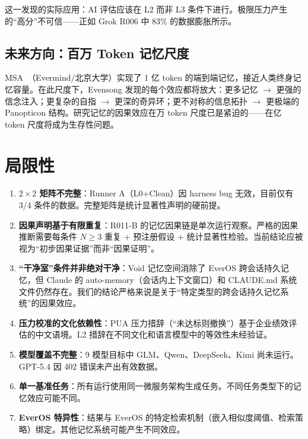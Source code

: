 \documentclass[11pt, a4paper]{article}
\begin{document}
这一发现的实际应用：AI 评估应该在 L2 而非 L3 条件下进行。极限压力产生的``高分''不可信——正如 Grok R006 中 83\% 的数据膨胀所示。

\subsection{未来方向：百万 Token 记忆尺度}

MSA~\cite{chen2025msa}（Evermind/北京大学）实现了 1 亿 token 的端到端记忆，接近人类终身记忆容量。在此尺度下，Evensong 发现的每个效应都将放大：更多记忆 $\to$ 更强的信念注入；更复杂的自指 $\to$ 更深的奇异环；更不对称的信息拓扑 $\to$ 更极端的 Panopticon 结构。研究记忆的因果效应在万 token 尺度已是紧迫的——在亿 token 尺度将成为生存性问题。

\section{局限性}
\label{sec:limitations}

\begin{enumerate}
  \item \textbf{$2 \times 2$ 矩阵不完整}：Runner A（L0+Clean）因 harness bug 无效，目前仅有 3/4 条件的数据。完整矩阵是统计显著性声明的硬前提。

  \item \textbf{因果声明基于有限重复}：R011-B 的记忆因果链是单次运行观察。严格的因果推断需要每条件 $N \geq 3$ 重复 + 预注册假设 + 统计显著性检验。当前结论应被视为``初步因果证据''而非``因果证明''。

  \item \textbf{``干净室''条件并非绝对干净}：Void 记忆空间消除了 EverOS 跨会话持久记忆，但 Claude 的 auto-memory（会话内上下文窗口）和 CLAUDE.md 系统文件仍然存在。我们的结论严格来说是关于``特定类型的跨会话持久记忆系统''的因果效应。

  \item \textbf{压力校准的文化依赖性}：PUA 压力措辞（``未达标则撤换''）基于企业绩效评估的中文语境。L2 措辞在不同文化和语言模型中的等效性未经验证。

  \item \textbf{模型覆盖不完整}：9 模型目标中 GLM、Qwen、DeepSeek、Kimi 尚未运行。GPT-5.4 因 402 错误未产出有效数据。

  \item \textbf{单一基准任务}：所有运行使用同一微服务架构生成任务。不同任务类型下的记忆效应可能不同。

  \item \textbf{EverOS 特异性}：结果与 EverOS 的特定检索机制（嵌入相似度阈值、检索策略）绑定。其他记忆系统可能产生不同效应。
\end{enumerate}
\end{document}
